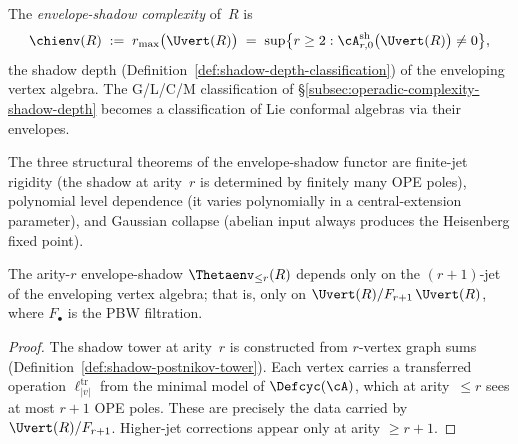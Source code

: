 \begin{definition}
\label{def:envelope-shadow-complexity}
\ClaimStatusProvedHere
{}
The \emph{envelope-shadow complexity} of~$R$ is
\begin{equation}\label{eq:envelope-shadow-complexity}
\chienv(R)
\;:=\;
r_{\max}\bigl(\Uvert(R)\bigr)
\;=\;
\sup\bigl\{r \ge 2 :
\cA^{\mathrm{sh}}_{r,0}\bigl(\Uvert(R)\bigr) \neq 0
\bigr\},
\end{equation}
the shadow depth
(Definition~\textup{\ref{def:shadow-depth-classification}})
of the enveloping vertex algebra.
The G/L/C/M classification of
\S\ref{subsec:operadic-complexity-shadow-depth} becomes a
classification of Lie conformal algebras via their envelopes.
\end{definition}

The three structural theorems of the envelope-shadow functor
are finite-jet rigidity (the shadow at arity~$r$ is
determined by finitely many OPE poles), polynomial level
dependence (it varies polynomially in a central-extension
parameter), and Gaussian collapse (abelian input always
produces the Heisenberg fixed point).

\begin{proposition}
\label{prop:finite-jet-rigidity}
The arity-$r$ envelope-shadow $\Thetaenv_{\leq r}(R)$
depends only on the $(r{+}1)$-jet of the enveloping vertex
algebra; that is, only on
$\Uvert(R) / F_{r+1}\,\Uvert(R)$,
where $F_\bullet$ is the PBW filtration.
\end{proposition}

\begin{proof}
The shadow tower at arity~$r$ is constructed from
$r$-vertex graph sums
(Definition~\ref{def:shadow-postnikov-tower}).
Each vertex carries a transferred operation
$\ell_{|v|}^{\mathrm{tr}}$ from the minimal model of
$\Defcyc(\cA)$, which at arity~$\leq r$ sees at most
$r{+}1$ OPE poles.  These are precisely the data carried
by $\Uvert(R)/F_{r+1}$.  Higher-jet corrections appear
only at arity $\geq r{+}1$.
\end{proof}

